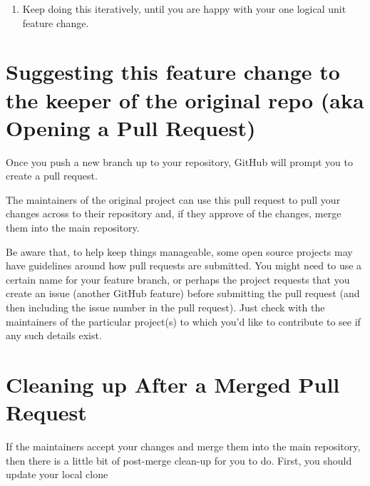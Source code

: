 \documentclass[
]{book}
\providecommand{\tightlist}{%
  \setlength{\itemsep}{0pt}\setlength{\parskip}{0pt}}
\begin{document}
\begin{enumerate}
\def\labelenumi{\arabic{enumi}.}
\setcounter{enumi}{3}
\tightlist
\item
  Keep doing this iteratively, until you are happy with your one logical unit feature change.
\end{enumerate}

\hypertarget{suggesting-this-feature-change-to-the-keeper-of-the-original-repo-aka-opening-a-pull-request}{%
\section{Suggesting this feature change to the keeper of the original repo (aka Opening a Pull Request)}\label{suggesting-this-feature-change-to-the-keeper-of-the-original-repo-aka-opening-a-pull-request}}

Once you push a new branch up to your repository, GitHub will prompt you to create a pull request.

The maintainers of the original project can use this pull request to pull your changes across to their repository and, if they approve of the changes, merge them into the main repository.

Be aware that, to help keep things manageable, some open source projects may have guidelines around how pull requests are submitted. You might need to use a certain name for your feature branch, or perhaps the project requests that you create an issue (another GitHub feature) before submitting the pull request (and then including the issue number in the pull request). Just check with the maintainers of the particular project(s) to which you'd like to contribute to see if any such details exist.

\hypertarget{cleaning-up-after-a-merged-pull-request}{%
\section{Cleaning up After a Merged Pull Request}\label{cleaning-up-after-a-merged-pull-request}}

If the maintainers accept your changes and merge them into the main repository, then there is a little bit of post-merge clean-up for you to do.
First, you should update your local clone
\end{document}
